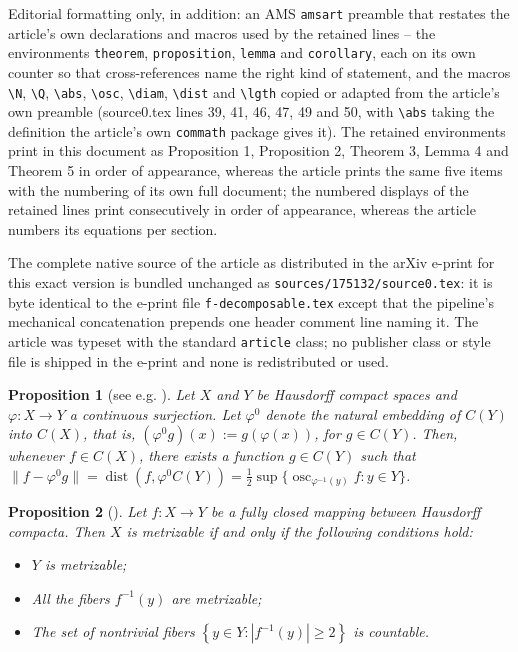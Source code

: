 \documentclass[10pt,a4paper]{amsart}
\newtheorem{proposition}{Proposition}
\DeclareMathOperator{\osc}{osc}
\DeclareMathOperator{\dist}{dist}
\begin{document}
Editorial formatting only, in addition: an AMS \texttt{amsart} preamble that restates the article's own declarations and macros used by the retained lines -- the environments \texttt{theorem}, \texttt{proposition}, \texttt{lemma} and \texttt{corollary}, each on its own counter so that cross-references name the right kind of statement, and the macros \texttt{\textbackslash N}, \texttt{\textbackslash Q}, \texttt{\textbackslash abs}, \texttt{\textbackslash osc}, \texttt{\textbackslash diam}, \texttt{\textbackslash dist} and \texttt{\textbackslash lgth} copied or adapted from the article's own preamble (source0.tex lines 39, 41, 46, 47, 49 and 50, with \texttt{\textbackslash abs} taking the definition the article's own \texttt{commath} package gives it). The retained environments print in this document as Proposition 1, Proposition 2, Theorem 3, Lemma 4 and Theorem 5 in order of appearance, whereas the article prints the same five items with the numbering of its own full document; the numbered displays of the retained lines print consecutively in order of appearance, whereas the article numbers its equations per section.

The complete native source of the article as distributed in the arXiv e-print for this exact version is bundled unchanged as \texttt{sources/175132/source0.tex}: it is byte identical to the e-print file \texttt{f-decomposable.tex} except that the pipeline's mechanical concatenation prepends one header comment line naming it. The article was typeset with the standard \texttt{article} class; no publisher class or style file is shipped in the e-print and none is redistributed or used.
\begin{proposition}[see e.g. {\cite[p. 173]{holmes_opt}}] \label{metr_proj}
	Let $X$ and $Y$ be Hausdorff compact spaces and $\varphi: X \to Y$ a continuous surjection. Let $\varphi^0$ denote the natural embedding of $C(Y)$ into $C(X)$, that is, $(\varphi^0 g)(x) := g(\varphi(x))$, for $g \in C(Y)$. Then, whenever $f \in C(X)$, there exists a function $g \in C(Y)$ such that $\|f- \varphi^0 g\| = \dist(f, \varphi^0 C(Y)) = \frac{1}{2} \sup \{\osc_{\varphi^{-1}(y)} f: y \in Y\}$.
\end{proposition}

\begin{proposition} [{\cite[II.3.10]{fedFC}}] \label{Fed_metr}
	Let $f: X \to Y$ be a fully closed mapping between Hausdorff compacta. Then $X$ is metrizable if and only if the following conditions hold:
	\begin{itemize}[noitemsep]
		\item $Y$ is metrizable;
		\item All the fibers $f^{-1}(y)$ are metrizable;
		\item The set of nontrivial fibers $\left\{y \in Y: \left|f^{-1}(y)\right| \geq 2\right\}$ is countable.
	\end{itemize}
\end{proposition}
\end{document}
